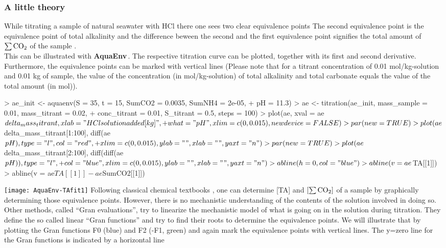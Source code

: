 \documentclass[article,nojss]{jss}
\newcommand{\aq}{\textbf{\textsf{AquaEnv}}}
\begin{document}
\subsubsection{A little theory}
While titrating a sample of natural seawater with HCl there one sees two clear equivalence points \citep{Dickson1981}
The second equivalence point is the equivalence point of total alkalinity and the difference beween the second and the first
equivalence point signifies the total amount of $\sum \rm CO_2$ of the sample \cite{Hansson1973}.\\

\noindent
This can be illustrated with \aq$\,$. The respective titration curve can be plotted, together with its first and second derivative.
Furthermore, the equivalence points can be marked with vertical lines (Please note that for a titrant concentration of 0.01 mol/kg-solution
and 0.01 kg of sample, the value of the concentration (in mol/kg-solution) of total alkalinity and total carbonate equals the value of the total 
amount (in mol)).

\begin{Schunk}
\begin{Sinput}
> ae_init <- aquaenv(S = 35, t = 15, SumCO2 = 0.0035, SumNH4 = 2e-05, 
+     pH = 11.3)
> ae <- titration(ae_init, mass_sample = 0.01, mass_titrant = 0.02, 
+     conc_titrant = 0.01, S_titrant = 0.5, steps = 100)
> plot(ae, xval = ae$delta_mass_titrant, xlab = "HCl solution added [kg]", 
+     what = "pH", xlim = c(0, 0.015), newdevice = FALSE)
> par(new = TRUE)
> plot(ae$delta_mass_titrant[1:100], diff(ae$pH), type = "l", col = "red", 
+     xlim = c(0, 0.015), ylab = "", xlab = "", yaxt = "n")
> par(new = TRUE)
> plot(ae$delta_mass_titrant[2:100], diff(diff(ae$pH)), type = "l", 
+     col = "blue", xlim = c(0, 0.015), ylab = "", xlab = "", yaxt = "n")
> abline(h = 0, col = "blue")
> abline(v = ae$TA[[1]])
> abline(v = ae$TA[[1]] - ae$SumCO2[[1]])
\end{Sinput}
\end{Schunk}
\texttt{[image: AquaEnv-TAfit1]}
Following classical chemical textbooks \citep[e.g.][]{Skoog1982}, one can determine [TA] and $\rm [\sum CO_2]$ of a sample
by graphically determining those equivalence points. However, there is no mechanistic understanding of the contents of the solution involved in doing so.\\

\noindent
Other methods, called ``Gran evaluations''\citep{Gran1952, Hansson1973, Dickson1981, Haraldsson1997, Anderson1999},
try to linearize the mechanistic model of what is going on in the solution during titration. 
They define the so called linear ``Gran functions''  and try to find their roots to determine the equivalence points.
We will illustrate that by plotting the Gran functions  F0 (blue) and F2 (-F1, green)  and again mark the equivalence points with vertical lines.
The y=zero line for the Gran functions is indicated by a horizontal line
\end{document}
